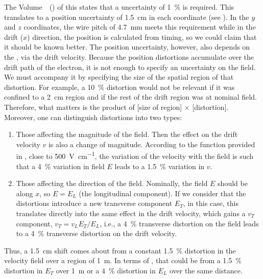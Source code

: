 The Volume~\volnumberphysics~(\voltitlephysics) of this  states that a  uncertainty of \SI{1}{\%} is required. 
This translates to a position uncertainty of \SI{1.5}{\cm} in each coordinate %
(see  \spchapa). In the $y$ and $z$ coordinates, the wire pitch of \SI{4.7}{\mm} meets this requirement while in the drift ($x$) direction, the position is calculated from timing, so we could claim that it should be known better.
The position uncertainty, however, also depends on the \efield, via the drift velocity. Because the position distortions accumulate over the drift path of the electron, it is not enough to specify an uncertainty on the field. We must accompany it by specifying the size of the spatial region of that distortion. For example, a \SI{10}{\%} distortion would not be relevant if it was confined to a \SI{2}{\cm} region and if the rest of the drift region was at nominal field.
Therefore, what matters is the product of [size of region] $\times$ [distortion]. Moreover, one can distinguish distortions into two types:
\begin{enumerate}
\item Those affecting the magnitude of the field. Then the effect on the drift velocity $v$ is also a change of magnitude. According to the function provided in \cite{Walkowiak:2000wf}, close to \SI{500}{\V\per\cm}, the variation of the velocity with the field is such that a \SI{4}{\%} variation in field $E$ leads to a \SI{1.5}{\%} variation in $v$.
\item Those affecting the direction of the field. Nominally, the field $E$ should be along $x$, so $E = E_L$ (the longitudinal component). If we consider that the distortions introduce a new transverse component $E_T$, in this case, this translates directly into the same effect in the drift velocity, which gains a $v_T$ component, $v_T=v_L  E_T/E_L $, i.e., a \SI{4}{\%} transverse distortion on the field leads to a \SI{4}{\%} transverse distortion on the drift velocity.
\end{enumerate}

Thus, a \SI{1.5}{\cm} shift comes about from a constant \SI{1.5}{\%} distortion in the velocity field over a region of \SI{1}{\m}. In terms of \efield, that could be from a \SI{1.5}{\%} distortion in $E_T$ over \SI{1}{\m} or a \SI{4}{\%} distortion in $E_L$ over the same distance.

